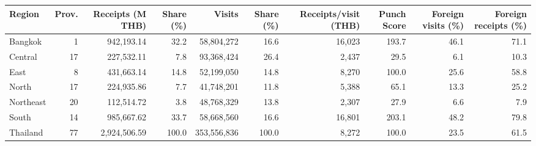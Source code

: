 \begin{tabular}{lrrrrrrrrr}
\toprule
Region & Prov. & Receipts (M THB) & Share (\%) & Visits & Share (\%) & Receipts/visit (THB) & Punch Score & Foreign visits (\%) & Foreign receipts (\%) \\
\midrule
Bangkok & 1 & 942,193.14 & 32.2 & 58,804,272 & 16.6 & 16,023 & 193.7 & 46.1 & 71.1 \\
Central & 17 & 227,532.11 & 7.8 & 93,368,424 & 26.4 & 2,437 & 29.5 & 6.1 & 10.3 \\
East & 8 & 431,663.14 & 14.8 & 52,199,050 & 14.8 & 8,270 & 100.0 & 25.6 & 58.8 \\
North & 17 & 224,935.86 & 7.7 & 41,748,201 & 11.8 & 5,388 & 65.1 & 13.3 & 25.2 \\
Northeast & 20 & 112,514.72 & 3.8 & 48,768,329 & 13.8 & 2,307 & 27.9 & 6.6 & 7.9 \\
South & 14 & 985,667.62 & 33.7 & 58,668,560 & 16.6 & 16,801 & 203.1 & 48.2 & 79.8 \\
Thailand & 77 & 2,924,506.59 & 100.0 & 353,556,836 & 100.0 & 8,272 & 100.0 & 23.5 & 61.5 \\
\bottomrule
\end{tabular}
